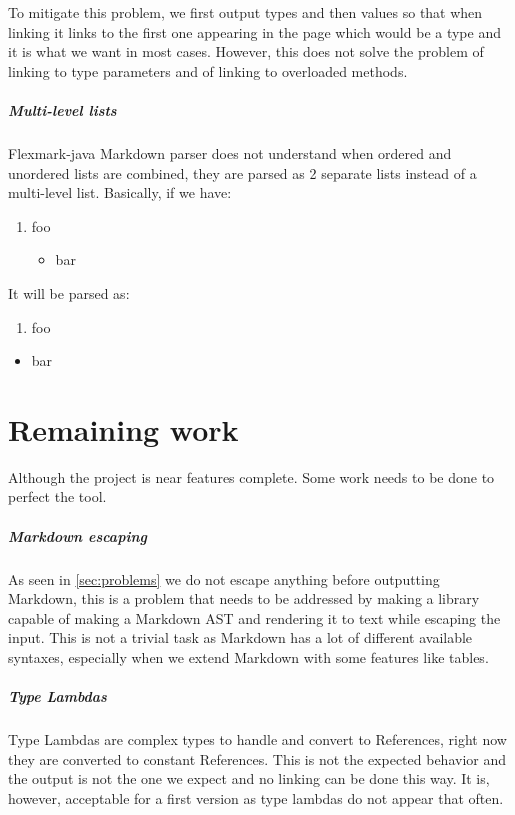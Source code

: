 \documentclass{report}
\begin{document}
To mitigate this problem, we first output types and then values so that when linking it links to the first one appearing in the page which would be a type and it is what we want in most cases. However, this does not solve the problem of linking to type parameters and of linking to overloaded methods.

\paragraph{Multi-level lists}
Flexmark-java Markdown parser does not understand when ordered and unordered lists are combined, they are parsed as 2 separate lists instead of a multi-level list. Basically, if we have:
\begin{enumerate}
    \item foo
    \begin{itemize}
        \item bar
    \end{itemize}
\end{enumerate}
It will be parsed as:
\begin{enumerate}
    \item foo
\end{enumerate}
\begin{itemize}
    \item bar
\end{itemize}

\chapter{Remaining work}
Although the project is near features complete. Some work needs to be done to perfect the tool.

\paragraph{Markdown escaping}
As seen in \autoref{sec:problems} we do not escape anything before outputting Markdown, this is a problem that needs to be addressed by making a library capable of making a Markdown AST and rendering it to text while escaping the input. This is not a trivial task as Markdown has a lot of different available syntaxes, especially when we extend Markdown with some features like tables.

\paragraph{Type Lambdas}
Type Lambdas are complex types to handle and convert to References, right now they are converted to constant References. This is not the expected behavior and the output is not the one we expect and no linking can be done this way. It is, however, acceptable for a first version as type lambdas do not appear that often.
\end{document}
